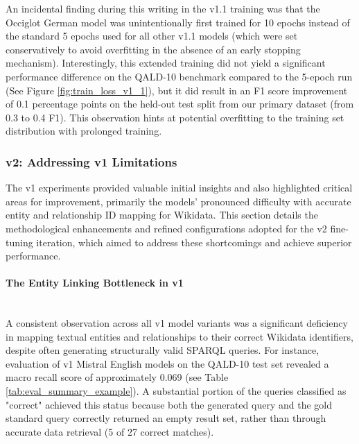 An incidental finding during this writing in the v1.1 training was that the Occiglot German model was unintentionally first trained for 10 epochs instead of the standard 5 epochs used for all other v1.1 models (which were set conservatively to avoid overfitting in the absence of an early stopping mechanism). 
Interestingly, this extended training did not yield a significant performance difference on the QALD-10 benchmark compared to the 5-epoch run (See Figure \ref{fig:train_loss_v1_1}), but it did result in an F1 score improvement of 0.1 percentage points on the held-out test split from our primary dataset (from 0.3 to 0.4 F1).
This observation hints at potential overfitting to the training set distribution with prolonged training.

\subsubsection{v2: Addressing v1 Limitations}\label{sec:v2_methodology}

The v1 experiments provided valuable initial insights and also highlighted critical areas for improvement, primarily the models' pronounced difficulty with accurate entity and relationship ID mapping for Wikidata. 
This section details the methodological enhancements and refined configurations adopted for the v2 fine-tuning iteration, which aimed to address these shortcomings and achieve superior performance.

\paragraph{The Entity Linking Bottleneck in v1} \mbox{}\\
A consistent observation across all v1 model variants was a significant deficiency in mapping textual entities and relationships to their correct Wikidata identifiers, despite often generating structurally valid SPARQL queries. 
For instance, evaluation of v1 Mistral English models on the QALD-10 test set revealed a macro recall score of approximately 0.069 (see Table \ref{tab:eval_summary_example}). 
A substantial portion of the queries classified as "correct" achieved this status because both the generated query and the gold standard query correctly returned an empty result set, rather than through accurate data retrieval (5 of 27 correct matches).

